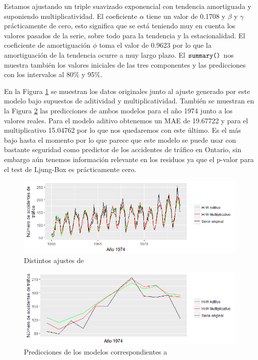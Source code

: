 Estamos ajustando un triple suavizado exponencial con tendencia amortiguada y suponiendo multiplicatividad. El coeficiente $\alpha$ tiene un valor de 0.1708 y $\beta$ y $\gamma$ prácticamente de cero, esto significa que se está teniendo muy en cuenta los valores pasados de la serie, sobre todo para la tendencia y la estacionalidad. El coeficiente de amortiguación $\phi$ toma el valor de 0.9623 por lo que la amortiguación de la tendencia ocurre a muy largo plazo. El $\verb!summary()!$ nos muestra también los valores iniciales de las tres componentes y las predicciones con los intervalos al 80$\%$ y 95$\%$.

En la  Figura \ref{hw_fit} se muestran los datos originales junto al ajuste generado por este modelo bajo supuestos de aditividad y multiplicatividad. También se muestran en la Figura \ref{hw_pred} las predicciones de ambos modelos para el año 1974 junto a los valores reales. Para el modelo aditivo obtenemos un MAE de 19.67722 y para el multiplicativo 15.04762 por lo que nos quedaremos con este último. Es el más bajo hasta el momento por lo que parece que este modelo se puede usar con bastante seguridad como predictor de los accidentes de tráfico en Ontario, sin embargo aún tenemos información relevante en los residuos ya que el p-valor para el test de Ljung-Box es prácticamente cero.
\begin{figure}
    \centering
    \centerline{\includegraphics[scale = 0.7]{Images/Modelizacion/313.png}}
    \caption{Distintos ajustes de }
    \label{hw_fit}
\end{figure}

\begin{figure}
    \centering
    \centerline{\includegraphics[scale = 0.7]{Images/Modelizacion/314.png}}
    \caption{Predicciones de los modelos correspondientes a }
    \label{hw_pred}
\end{figure}


